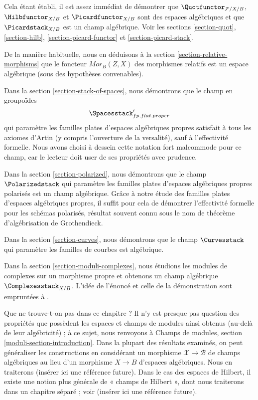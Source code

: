 \medskip\noindent
Cela étant établi, il est assez immédiat de démontrer que
$\Quotfunctor_{\mathcal{F}/X/B}$, $\Hilbfunctor_{X/B}$ et
$\Picardfunctor_{X/B}$ sont des espaces algébriques et que
$\Picardstack_{X/B}$ est un champ algébrique. Voir les sections
\ref{section-quot}, \ref{section-hilb},
\ref{section-picard-functor} et \ref{section-picard-stack}.

\medskip\noindent
De la manière habituelle, nous en déduisons à la section
\ref{section-relative-morphisms} que le foncteur
$\mathit{Mor}_B(Z, X)$ des morphismes relatifs est un espace algébrique (sous
des hypothèses convenables).

\medskip\noindent
Dans la section \ref{section-stack-of-spaces}, nous démontrons que le champ en
groupoïdes
$$
\Spacesstack'_{fp, flat, proper}
$$
qui paramètre les familles plates d'espaces algébriques propres satisfait à
tous les axiomes d'Artin (y compris l'ouverture de la versalité), sauf à
l'effectivité formelle. Nous avons choisi à dessein cette notation fort
malcommode pour ce champ, car le lecteur doit user de ses propriétés avec
prudence.

\medskip\noindent
Dans la section \ref{section-polarized}, nous démontrons que le champ
$\Polarizedstack$ qui paramètre les familles plates d'espaces algébriques
propres polarisés est un champ algébrique. Grâce à notre étude des familles
plates d'espaces algébriques propres, il suffit pour cela de démontrer
l'effectivité formelle pour les schémas polarisés, résultat souvent connu
sous le nom de théorème d'algébrisation de Grothendieck.

\medskip\noindent
Dans la section \ref{section-curves}, nous démontrons que le champ
$\Curvesstack$ qui paramètre les familles de courbes est algébrique.

\medskip\noindent
Dans la section \ref{section-moduli-complexes}, nous étudions les modules de
complexes sur un morphisme propre et obtenons un champ algébrique
$\Complexesstack_{X/B}$. L'idée de l'énoncé et celle de la démonstration sont
empruntées à \cite{lieblich-complexes}.

\medskip\noindent
Que ne trouve-t-on pas dans ce chapitre ? Il n'y est presque pas question des
propriétés que possèdent les espaces et champs de modules ainsi obtenus (au-delà
de leur algébricité) ; à ce sujet, nous renvoyons à Champs de modules,
section \ref{moduli-section-introduction}. Dans la plupart des résultats
examinés, on peut généraliser les constructions en considérant un morphisme
$\mathcal{X} \to \mathcal{B}$ de champs algébriques au lieu d'un morphisme
$X \to B$ d'espaces algébriques. Nous en traiterons (insérer ici une référence
future). Dans le cas des espaces de Hilbert, il existe une notion plus générale
de « champs de Hilbert », dont nous traiterons dans un chapitre séparé ; voir
(insérer ici une référence future).




